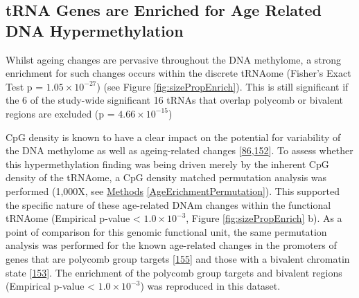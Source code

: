 \documentclass[
]{book}
\begin{document}
\hypertarget{trna-genes-are-enriched-for-age-related-dna-hypermethylation}{%
\subsection{tRNA Genes are Enriched for Age Related DNA Hypermethylation}\label{trna-genes-are-enriched-for-age-related-dna-hypermethylation}}

Whilst ageing changes are pervasive throughout the DNA methylome, a strong enrichment for such changes occurs within the discrete tRNAome (Fisher's Exact Test p = \(1.05\times10^{-27}\)) (see Figure \ref{fig:sizePropEnrich}).
This is still significant if the 6 of the study-wide significant 16 tRNAs that overlap polycomb or bivalent regions are excluded (p = \(4.66\times10^{-15}\))

CpG density is known to have a clear impact on the potential for variability of the DNA methylome as well as ageing-related changes {[}\protect\hyperlink{ref-Ziller2013}{86},\protect\hyperlink{ref-Christensen2009}{152}{]}.
To assess whether this hypermethylation finding was being driven merely by the inherent CpG density of the tRNAome, a CpG density matched permutation analysis was performed (1,000X, see \protect\hyperlink{AgeErichmentPermutation}{Methods} \ref{AgeErichmentPermutation}).
This supported the specific nature of these age-related DNAm changes within the functional tRNAome (Empirical p-value \textless{} \(1.0\times10^{-3}\), Figure \ref{fig:sizePropEnrich} b).
As a point of comparison for this genomic functional unit, the same permutation analysis was performed for the known age-related changes in the promoters of genes that are polycomb group targets {[}\protect\hyperlink{ref-Teschendorff2010}{155}{]} and those with a bivalent chromatin state {[}\protect\hyperlink{ref-Rakyan2010}{153}{]}.
The enrichment of the polycomb group targets and bivalent regions (Empirical p-value \textless{} \(1.0\times10^{-3}\)) was reproduced in this dataset.
\end{document}
